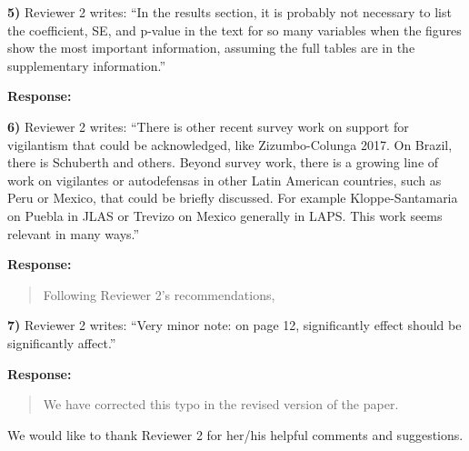 \documentclass[a4paper,12pt]{article}
\begin{document}
\vspace{.3cm}

\noindent \textbf{5)} Reviewer 2 writes: ``In the results section, it is
probably not necessary to list the coefficient, SE, and p-value in the text for
so many variables when the figures show the most important information,
assuming the full tables are in the supplementary information.'' 

\vspace{.3cm}

\noindent \textbf{Response:} 
\begin{quote}

\end{quote}

\vspace{.3cm}

\noindent \textbf{6)} Reviewer 2 writes: ``There is other recent survey work on
support for vigilantism that could be acknowledged, like Zizumbo-Colunga 2017.
On Brazil, there is Schuberth and others. Beyond survey work, there is a
growing line of work on vigilantes or autodefensas in other Latin American
countries, such as Peru or Mexico, that could be briefly discussed. For example
Kloppe-Santamaria on Puebla in JLAS or Trevizo on Mexico generally in LAPS.
This work seems relevant in many ways.''

\vspace{.3cm}

\noindent \textbf{Response:} 
\begin{quote}
    Following Reviewer 2's recommendations, 

\end{quote}

\vspace{.3cm}

\noindent \textbf{7)} Reviewer 2 writes: ``Very minor note: on page 12,
significantly effect should be significantly affect.''

\vspace{.3cm}

\noindent \textbf{Response:} 
\begin{quote}
    We have corrected this typo in the revised version of the paper.
\end{quote}

\vspace{.3cm}

We would like to thank Reviewer 2 for her/his helpful comments and suggestions.

\newpage


\end{document}
